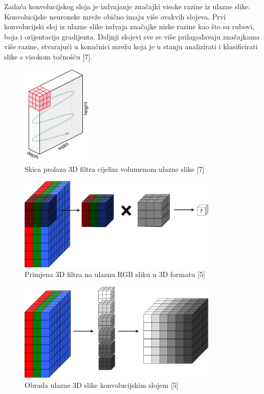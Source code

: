 \documentclass[times, utf8, zavrsni]{fer}
\begin{document}
\indent{}
Zadaća konvolucijskog sloja je izdvajanje značajki visoke razine iz ulazne slike. Konvolucijske neuronske mreže obično imaju više ovakvih slojeva. Prvi konvolucijski sloj iz ulazne slike izdvaja značajke niske razine kao što su rubovi, boja i orijentacija gradijenta. Daljnji slojevi sve se više prilagođavaju značajkama više razine, stvarajući u konačnici mrežu koja je u stanju analizirati i klasificirati slike s visokom točnošću [7]. 

\newpage
%
\begin{figure}[!h]
\centering
\includegraphics[width=0.3\textwidth]{./slike/conv8}
\caption{Skica prolaza 3D filtra cijelim volumenom ulazne slike [7]}
\label{fig:conv7}
\end{figure}
%
\begin{figure}[!h]
\centering
\includegraphics[width=0.85\textwidth]{./slike/conv7}
\caption{Primjena 3D filtra na ulaznu RGB sliku u 3D formatu [5]}
\label{fig:conv6}
\end{figure}
% 
\begin{figure}[!h]
\centering
\includegraphics[width=0.85\textwidth]{./slike/conv9}
\caption{Obrada ulazne 3D slike konvolucijskim slojem [5]}
\label{fig:conv6}
\end{figure}
% 
\newpage
\end{document}
